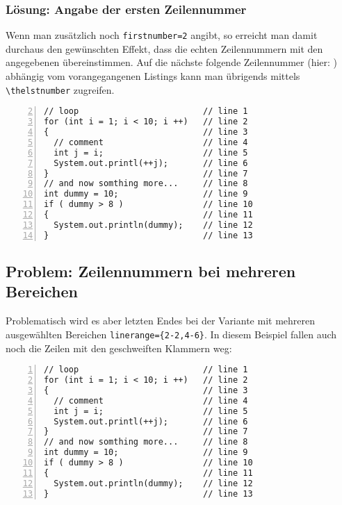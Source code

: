 \documentclass[a4paper,10pt]{article}
\begin{document}
\subsubsection*{Lösung: Angabe der ersten Zeilennummer}
Wenn man zusätzlich noch \texttt{\verb|firstnumber=2|} angibt, so erreicht man damit durchaus den gewünschten Effekt, dass die echten Zeilennummern mit den angegebenen übereinstimmen. Auf die nächste folgende Zeilennummer (hier: \thelstnumber) abhängig vom vorangegangenen Listings kann man übrigends mittels \texttt{\verb|\thelstnumber|} zugreifen.

\begin{lstlisting}[numbers=left, frame=single, firstline=2, lastline=7, firstnumber=2]
// loop                         // line 1
for (int i = 1; i < 10; i ++)   // line 2
{                               // line 3
  // comment                    // line 4
  int j = i;                    // line 5
  System.out.printl(++j);       // line 6
}                               // line 7
// and now somthing more...     // line 8
int dummy = 10;                 // line 9
if ( dummy > 8 )                // line 10
{                               // line 11
  System.out.println(dummy);    // line 12
}                               // line 13
\end{lstlisting}

\subsection{Problem: Zeilennummern bei mehreren Bereichen}
Problematisch wird es aber letzten Endes bei der Variante mit mehreren ausgewählten Bereichen \texttt{\verb|linerange={2-2,4-6}|}. In diesem Beispiel fallen auch noch die Zeilen mit den geschweiften Klammern weg:

\begin{lstlisting}[numbers=left, frame=single, linerange={2-2,4-6}]
// loop                         // line 1
for (int i = 1; i < 10; i ++)   // line 2
{                               // line 3
  // comment                    // line 4
  int j = i;                    // line 5
  System.out.printl(++j);       // line 6
}                               // line 7
// and now somthing more...     // line 8
int dummy = 10;                 // line 9
if ( dummy > 8 )                // line 10
{                               // line 11
  System.out.println(dummy);    // line 12
}                               // line 13
\end{lstlisting}
\end{document}

